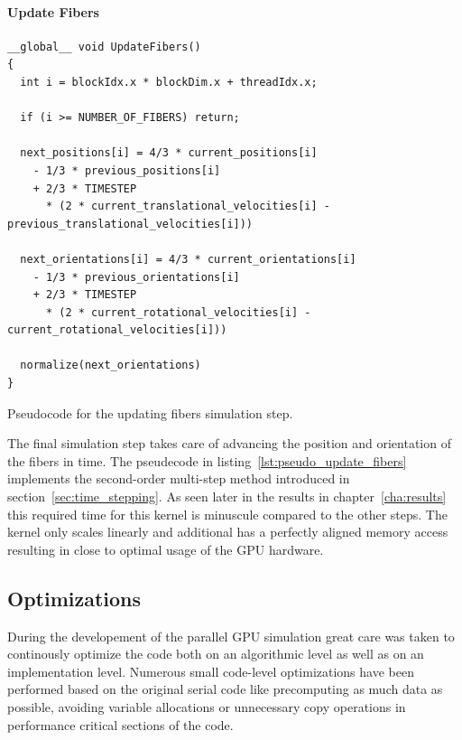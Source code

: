 \documentclass[a4paper,11pt]{kth-mag}
\begin{document}
\paragraph{Update Fibers}

\begin{listing}
  \centering
  \begin{verbatim}
__global__ void UpdateFibers()
{
  int i = blockIdx.x * blockDim.x + threadIdx.x;

  if (i >= NUMBER_OF_FIBERS) return;

  next_positions[i] = 4/3 * current_positions[i]
    - 1/3 * previous_positions[i]
    + 2/3 * TIMESTEP
      * (2 * current_translational_velocities[i] - previous_translational_velocities[i]))

  next_orientations[i] = 4/3 * current_orientations[i]
    - 1/3 * previous_orientations[i]
    + 2/3 * TIMESTEP
      * (2 * current_rotational_velocities[i] - current_rotational_velocities[i]))

  normalize(next_orientations)
}
  \end{verbatim}
  \caption{Pseudocode for the updating fibers simulation step.}
  \label{lst:pseudo_update_fibers}
\end{listing}

The final simulation step takes care of advancing the position and orientation of the fibers in time. The pseudecode in listing~\ref{lst:pseudo_update_fibers} implements the second-order multi-step method introduced in section~\ref{sec:time_stepping}. As seen later in the results in chapter~\ref{cha:results} this required time for this kernel is minuscule compared to the other steps. The kernel only scales linearly and additional has a perfectly aligned memory access resulting in close to optimal usage of the GPU hardware.

\subsection{Optimizations}

During the developement of the parallel GPU simulation great care was taken to continously optimize the code both on an algorithmic level as well as on an implementation level. Numerous small code-level optimizations have been performed based on the original serial code like precomputing as much data as possible, avoiding variable allocations or unnecessary copy operations in performance critical sections of the code.
\end{document}
